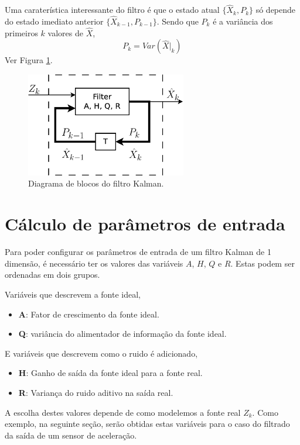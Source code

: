 \documentclass[a4paper,10pt]{article}
\begin{document}
Uma caraterística interessante do filtro é que o estado atual $\{\hat{X}_k,P_k\}$ 
só depende do estado imediato anterior  $\{\hat{X}_{k-1},P_{k-1}\}$. 
Sendo que $P_k$  é a variância dos primeiros $k$ valores de $\hat{X}$,
\begin{equation}
 P_k  = Var(\hat{X}|_{k})
\end{equation}
Ver Figura \ref{fig:filterrec}.

\begin{figure}[!ht]
\center
 \includegraphics[width=7.0cm]{./images/KalmanFilter.eps}
\caption{Diagrama de blocos do filtro Kalman.}
\label{fig:filterrec}
\end{figure} 

\section{Cálculo de parâmetros de entrada} \label{sec:calculo}

Para poder configurar os parâmetros de entrada de um filtro Kalman de 1 dimensão,
é necessário ter os valores das variáveis $A$, $H$, $Q$ e $R$. 
Estas podem ser ordenadas em dois grupos.

Variáveis que descrevem a fonte ideal,
\begin{itemize}
 \item \textbf{A}:  Fator de crescimento da fonte ideal.
 \item \textbf{Q}:  variância do alimentador de informação da fonte ideal.
\end{itemize}
E variáveis que descrevem como o ruido é adicionado,
\begin{itemize}
 \item \textbf{H}:  Ganho de saída da fonte ideal para a fonte real.
 \item \textbf{R}:  Variança do ruido aditivo na saída real.
\end{itemize}

A escolha destes valores depende de como modelemos a fonte real $Z_k$. Como exemplo,
na seguinte seção, serão obtidas estas variáveis para o caso do filtrado da
saída de um sensor de aceleração.
\end{document}

